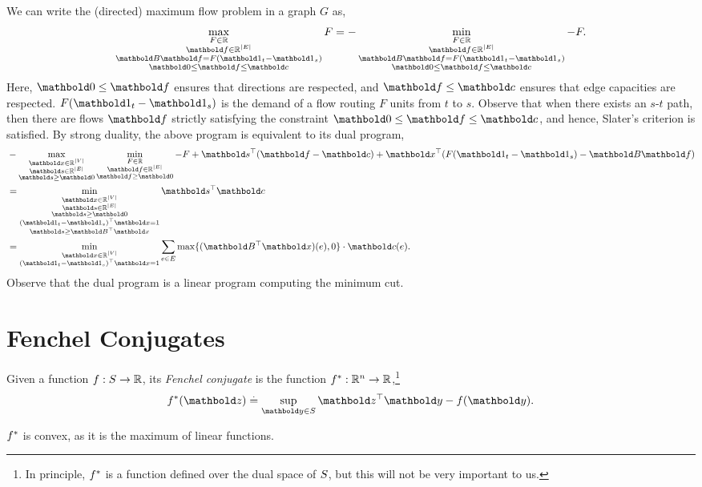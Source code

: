 We can write the (directed) maximum flow problem in a graph $G$ as, \begin{align}
    \max_{\substack{F \in \R \\ \vf \in \R^{|\sE|} \\ \mB\vf = F(\vOne_t - \vOne_s) \\ \vZero \leq \vf \leq \vc}} F = - \min_{\substack{F \in \R \\ \vf \in \R^{|\sE|} \\ \mB\vf = F(\vOne_t - \vOne_s) \\ \vZero \leq \vf \leq \vc}} -F.
\end{align} Here, $\vZero \leq \vf$ ensures that directions are respected, and $\vf \leq \vc$ ensures that edge capacities are respected. $F(\vOne_t - \vOne_s)$ is the demand of a flow routing $F$ units from $t$ to $s$. Observe that when there exists an $s$-$t$ path, then there are flows $\vf$ strictly satisfying the constraint $\vZero \leq \vf \leq \vc$, and hence, Slater's criterion is satisfied. By strong duality, the above program is equivalent to its dual program, \begin{align}
    &- \max_{\substack{\vx \in \R^{|\sV|} \\ \vs \in \R^{|\sE|} \\ \vs \geq \vZero}} \min_{\substack{F \in \R \\ \vf \in \R^{|\sE|} \\ \vf \geq \vZero}} -F + \trans{\vs}(\vf - \vc) + \trans{\vx}(F(\vOne_t - \vOne_s) - \mB\vf) \\
    &= \min_{\substack{\vx \in \R^{|\sV|} \\ \vs \in \R^{|\sE|} \\ \vs \geq \vZero \\ \trans{(\vOne_t - \vOne_s)}\vx = 1 \\ \vs \geq \trans{\mB}\vx}} \trans{\vs}\vc \\
    &= \min_{\substack{\vx \in \R^{|\sV|} \\ \trans{(\vOne_t - \vOne_s)}\vx = 1}} \sum_{e \in \sE} \max\{(\trans{\mB}\vx)(e), 0\}\cdot\vc(e).
\end{align} Observe that the dual program is a linear program computing the minimum cut.

\section{Fenchel Conjugates}

\begin{defn}
Given a function $f : S \to \mathbb{R}$, its \emph{Fenchel conjugate} is the function $f^* : \mathbb{R}^n \to \mathbb{R}$,\footnote{In principle, $f^*$ is a function defined over the dual space of $S$, but this will not be very important to us.} \begin{align}
    \s{f}(\vz) \defeq \sup_{\vy \in \sS} \trans{\vz}\vy - f(\vy).
\end{align}
\end{defn}
\begin{rmk}
$f^*$ is convex, as it is the maximum of linear functions.
\end{rmk}

